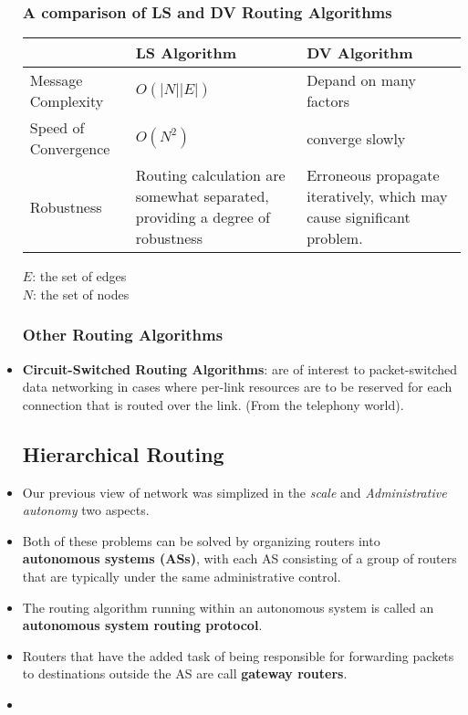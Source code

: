 \documentclass{article}
\begin{document}
\begin{itemize}
\subsubsection{A comparison of LS and DV Routing Algorithms}
\begin{center}
\begin{tabular}{| l |p{5cm}|p{5cm}|}
  \hline
   & LS Algorithm & DV Algorithm \\ \hline
  Message Complexity & $O(|N||E|)$   & Depand on many factors \\ \hline
  Speed of Convergence  & $O(N^2)$ & converge slowly \\ \hline
  Robustness & Routing calculation are somewhat separated, providing a degree of robustness & Erroneous propagate iteratively, which may cause significant problem. \\ \hline
\end{tabular}
$E$: the set of edges \\
$N$: the set of nodes \\
\end{center}
\subsubsection{Other Routing Algorithms}
\item \textbf{Circuit-Switched Routing Algorithms}: are of interest to packet-switched data networking in cases where per-link resources are to be reserved for each connection that is routed over the link. (From the telephony world).
\subsection{Hierarchical Routing}
\item Our previous view of network was simplized in the \emph{scale} and \emph{Administrative autonomy} two aspects.
\item Both of these problems can be solved by organizing routers into \textbf{autonomous systems (ASs)}, with each AS consisting of a group of routers that are typically under the same administrative control.
\item The routing algorithm running within an autonomous system is called an \textbf{autonomous system routing protocol}.
\item Routers that have the added task of being responsible for forwarding packets to destinations outside the AS are call \textbf{gateway routers}.
\item 
\end{itemize}
\end{document}
